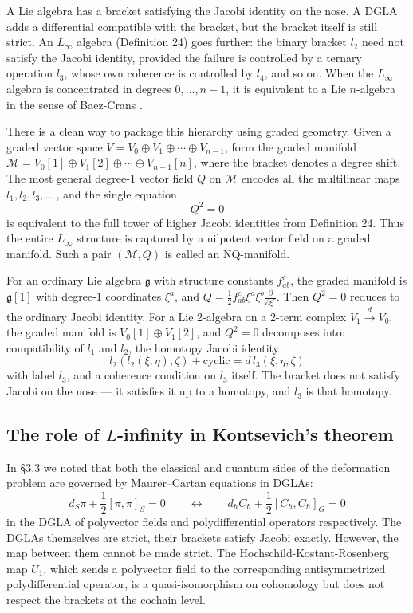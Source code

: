 \documentclass[
  12pt,
  a4paper, oneside
]{report}
\renewcommand{\hbar}{\hslash}
\theoremstyle{bolddef}
\theoremstyle{remark}
\numberwithin{equation}{chapter}
\begin{document}
A Lie algebra has a bracket satisfying the Jacobi identity on the nose. A DGLA adds a differential compatible with the bracket, but the bracket itself is still strict. An $L_\infty$ algebra (Definition 24) goes further: the binary bracket $l_2$ need not satisfy the Jacobi identity, provided the failure is controlled by a ternary operation $l_3$, whose own coherence is controlled by $l_4$, and so on. When the $L_\infty$ algebra is concentrated in degrees $0, \ldots, n-1$, it is equivalent to a Lie $n$-algebra in the sense of Baez-Crans \cite{BaezCrans}.

There is a clean way to package this hierarchy using graded geometry. Given a graded vector space $V = V_0 \oplus V_1 \oplus \cdots \oplus V_{n-1}$, form the graded manifold $\mathcal{M} = V_0[1] \oplus V_1[2] \oplus \cdots \oplus V_{n-1}[n]$, where the bracket denotes a degree shift. The most general degree-1 vector field $Q$ on $\mathcal{M}$ encodes all the multilinear maps $l_1, l_2, l_3, \ldots$\,, and the single equation
\begin{equation}\label{eq:Q-squared}
Q^2 = 0
\end{equation}
is equivalent to the full tower of higher Jacobi identities from Definition 24. Thus the entire $L_\infty$ structure is captured by a nilpotent vector field on a graded manifold. Such a pair $(\mathcal{M}, Q)$ is called an NQ-manifold.

For an ordinary Lie algebra $\mathfrak{g}$ with structure constants $f^c_{ab}$, the graded manifold is $\mathfrak{g}[1]$ with degree-1 coordinates $\xi^a$, and $Q = \frac{1}{2}f^c_{ab}\xi^a\xi^b \frac{\partial}{\partial \xi^c}$. Then $Q^2 = 0$ reduces to the ordinary Jacobi identity. For a Lie 2-algebra on a 2-term complex $V_1 \xrightarrow{d} V_0$, the graded manifold is $V_0[1] \oplus V_1[2]$, and $Q^2 = 0$ decomposes into: compatibility of $l_1$ and $l_2$, the homotopy Jacobi identity
\[
l_2(l_2(\xi, \eta), \zeta) + \text{cyclic} = d\,l_3(\xi, \eta, \zeta)
\]
with label $l_3$, and a coherence condition on $l_3$ itself. The bracket does not satisfy Jacobi on the nose --- it satisfies it up to a homotopy, and $l_3$ is that homotopy.

\subsection*{The role of $L$-infinity in Kontsevich's theorem}

In \S 3.3 we noted that both the classical and quantum sides of the deformation problem are governed by Maurer--Cartan equations in DGLAs:
\[
d_S\pi + \frac{1}{2}[\pi, \pi]_S = 0 \qquad \longleftrightarrow \qquad d_h C_\hbar + \frac{1}{2}[C_\hbar, C_\hbar]_G = 0
\]
in the DGLA of polyvector fields and polydifferential operators respectively. The DGLAs themselves are strict, their brackets satisfy Jacobi exactly. However, the map between them cannot be made strict. The Hochschild-Kostant-Rosenberg map $U_1$, which sends a polyvector field to the corresponding antisymmetrized polydifferential operator, is a quasi-isomorphism on cohomology but does not respect the brackets at the cochain level.
\end{document}
